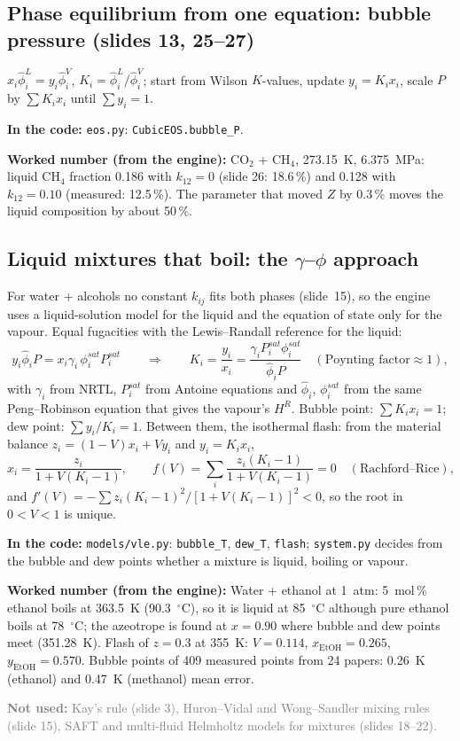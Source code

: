 \documentclass[11pt,a4paper]{article}
\newcommand{\code}[1]{\texttt{\small #1}}
\newcommand{\where}[1]{\par\noindent\textbf{In the code:} #1\par}
\newcommand{\num}[1]{\par\noindent\textbf{Worked number (from the engine):} #1\par}
\newcommand{\notused}[1]{\par\noindent\textcolor{gray}{\textbf{Not used:} #1}\par}
\begin{document}
\subsection{Phase equilibrium from one equation: bubble pressure (slides 13, 25--27)}
$x_i\hat\phi_i^L=y_i\hat\phi_i^V$, $K_i=\hat\phi_i^L/\hat\phi_i^V$; start from Wilson $K$-values, update
$y_i=K_ix_i$, scale $P$ by $\sum K_ix_i$ until $\sum y_i=1$.
\where{\code{eos.py}: \code{CubicEOS.bubble\_P}.}
\num{CO$_2$ + CH$_4$, 273.15~K, 6.375~MPa: liquid CH$_4$ fraction 0.186 with $k_{12}=0$ (slide 26: 18.6\,\%)
and 0.128 with $k_{12}=0.10$ (measured: 12.5\,\%). The parameter that moved $Z$ by 0.3\,\% moves the liquid
composition by about 50\,\%.}

\subsection{Liquid mixtures that boil: the $\gamma$--$\phi$ approach}\label{sec:vle}
For water + alcohols no constant $k_{ij}$ fits both phases (slide~15), so the engine uses a liquid-solution
model for the liquid and the equation of state only for the vapour. Equal fugacities with the
Lewis--Randall reference for the liquid:
\[
y_i\hat\phi_iP=x_i\gamma_i\,\phi_i^{sat}P_i^{sat}\qquad\Rightarrow\qquad
K_i=\frac{y_i}{x_i}=\frac{\gamma_iP_i^{sat}\phi_i^{sat}}{\hat\phi_iP}\quad(\text{Poynting factor}\approx1),
\]
with $\gamma_i$ from NRTL, $P_i^{sat}$ from Antoine equations and $\hat\phi_i$, $\phi_i^{sat}$ from the same
Peng--Robinson equation that gives the vapour's $H^R$. Bubble point: $\sum K_ix_i=1$; dew point:
$\sum y_i/K_i=1$. Between them, the isothermal flash: from the material balance $z_i=(1-V)x_i+Vy_i$ and
$y_i=K_ix_i$,
\[
x_i=\frac{z_i}{1+V(K_i-1)},\qquad
f(V)=\sum_i\frac{z_i(K_i-1)}{1+V(K_i-1)}=0 \quad(\text{Rachford--Rice}),
\]
and $f'(V)=-\sum z_i(K_i-1)^2/[1+V(K_i-1)]^2<0$, so the root in $0<V<1$ is unique.
\where{\code{models/vle.py}: \code{bubble\_T}, \code{dew\_T}, \code{flash}; \code{system.py} decides from the
bubble and dew points whether a mixture is liquid, boiling or vapour.}
\num{Water + ethanol at 1~atm: 5~mol\,\% ethanol boils at 363.5~K (90.3~$^\circ$C), so it is liquid at
85~$^\circ$C although pure ethanol boils at 78~$^\circ$C; the azeotrope is found at $x=0.90$ where bubble and dew
points meet (351.28~K). Flash of $z=0.3$ at 355~K: $V=0.114$, $x_{\mathrm{EtOH}}=0.265$,
$y_{\mathrm{EtOH}}=0.570$. Bubble points of 409 measured points from 24 papers: 0.26~K (ethanol) and
0.47~K (methanol) mean error.}
\notused{Kay's rule (slide 3), Huron--Vidal and Wong--Sandler mixing rules (slide 15), SAFT and multi-fluid
Helmholtz models for mixtures (slides 18--22).}
\end{document}
